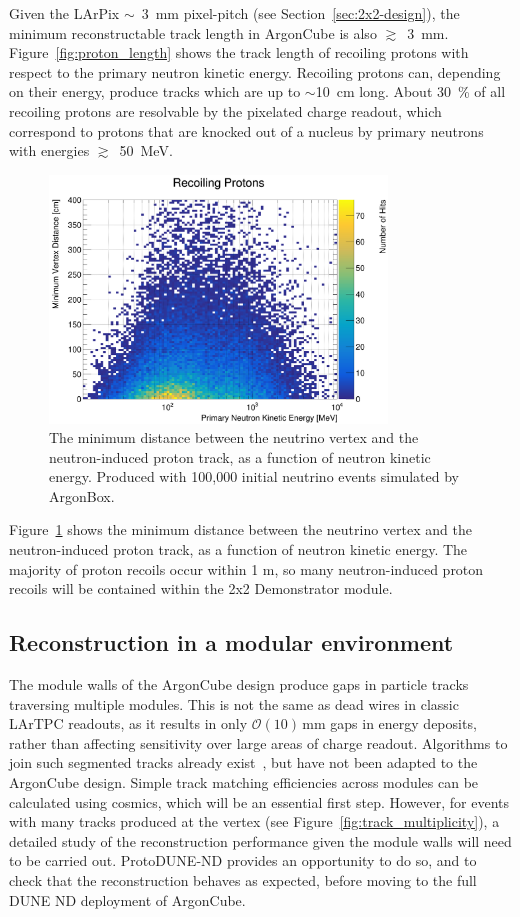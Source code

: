 Given the LArPix $\sim$~3~mm pixel-pitch (see Section~\ref{sec:2x2-design}), the minimum reconstructable track length in ArgonCube is also $\gtrsim$~3~mm. Figure~\ref{fig:proton_length} shows the track length of recoiling protons with respect to the primary neutron kinetic energy. Recoiling protons can, depending on their energy, produce tracks which are up to $\sim$10~cm long. About 30~\% of all recoiling protons are resolvable by the pixelated charge readout, which correspond to protons that are knocked out of a nucleus by primary neutrons with energies $\gtrsim$~50~MeV.

\begin{figure}[htbp]
  \centering
  \includegraphics[width=0.8\textwidth]{plots/min_dist_vtx_proton_recoil.png}
  \caption{The minimum distance between the neutrino vertex and the neutron-induced proton track, as a function of neutron kinetic energy. Produced with 100,000 initial neutrino events simulated by ArgonBox.}
  \label{fig:min_dist_proton}
\end{figure}
Figure~\ref{fig:min_dist_proton} shows the minimum distance between the neutrino vertex and the neutron-induced proton track, as a function of neutron kinetic energy. The majority of proton recoils occur within 1 m, so many neutron-induced proton recoils will be contained within the 2x2 Demonstrator module.

\subsection{Reconstruction in a modular environment}
The module walls of the ArgonCube design produce gaps in particle tracks traversing multiple modules. This is not the same as dead wires in classic LArTPC readouts, as it results in only $\mathcal{O}\left(10\right)\,\mathrm{mm}$ gaps in energy deposits, rather than affecting sensitivity over large areas of charge readout. Algorithms to join such segmented tracks already exist~\cite{pandora}, but have not been adapted to the ArgonCube design. Simple track matching efficiencies across modules can be calculated using cosmics, which will be an essential first step. However, for events with many tracks produced at the vertex (see Figure~\ref{fig:track_multiplicity}), a detailed study of the reconstruction performance given the module walls will need to be carried out. ProtoDUNE-ND provides an opportunity to do so, and to check that the reconstruction behaves as expected, before moving to the full DUNE ND deployment of ArgonCube.

